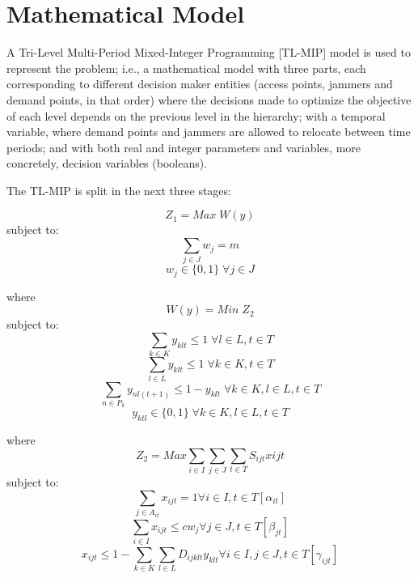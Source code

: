 \documentclass[runningheads]{llncs}
\begin{document}
\section{Mathematical Model}

A Tri-Level Multi-Period Mixed-Integer Programming [TL-MIP] model is used to represent the problem; i.e., a mathematical model with three parts, each corresponding to different decision maker entities (access points, jammers and demand points, in that order) where the decisions made to optimize the objective of each level depends on the previous level in the hierarchy; with a temporal variable, where demand points and jammers are allowed to relocate between time periods; and with both real and integer parameters and variables, more concretely, decision variables (booleans).

The TL-MIP is split in the next three stages:

\begin{equation}\tag{1a}
    Z_1 = Max \; W(y)
\end{equation}
subject to:
\begin{equation}\tag{1b}
    \sum_{j \in J} w_j = m
\end{equation}
\begin{equation}\tag{1c}
    w_j \in \{0,1\} \; \forall j \in J
\end{equation}

where
\begin{equation}\tag{2a}
    W(y) = Min \; Z_2
\end{equation}
subject to:
\begin{equation}\tag{2b}
    \sum_{k \in K} y_{klt} \leq 1 \; \forall l \in L, t \in T
\end{equation}
\begin{equation}\tag{2c}
    \sum_{l \in L} y_{klt} \leq 1 \; \forall k \in K, t \in T
\end{equation}
\begin{equation}\tag{2d}
    \sum_{n \in P_k} y_{nl(t+1)} \leq 1-y_{klt} \; \forall k \in K, l \in L, t \in T
\end{equation}
\begin{equation}\tag{2e}
    y_{ktl} \in \{0,1\} \; \forall k\in K, l \in L, t \in T
\end{equation}

where
\begin{equation}\tag{3a}
\label{Eq3a}
    Z_2 = Max \sum_{i \in I} \sum_{j \in J} \sum_{t \in T} S_{ijt} x{ijt}
\end{equation}
subject to:
\begin{equation}\tag{3b}
    \sum_{j \in A_{it}} x_{ijt} = 1 \forall i \in I, t \in T [\alpha_{it}]
\end{equation}
\begin{equation}\tag{3c}
    \sum_{i \in I} x_{ijt} \leq cw_j \forall j \in J, t \in T [\beta_{jt}]
\end{equation}
\begin{equation}\tag{3d}
    x_{ijt} \leq 1 - \sum_{k \in K} \sum_{l \in L} D_{ijklt} y_{klt} \forall i \in I, j \in J, t \in T [\gamma_{ijt}]
\end{equation}
\end{document}
